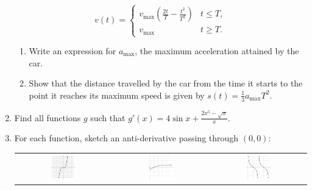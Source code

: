 \begin{enumerate}
\begin{displaymath}
          v(t) = \begin{cases} v_\text{max} \left( \frac{2t}{T} - \frac{t^2}{T^2} \right) & t \leq T, \\ v_\text{max} & t \geq T. \end{cases}
        \end{displaymath}
    \begin{enumerate}
      \item Write an expression for $ a_\text{max} $, the maximum acceleration attained by the car.
      \item Show that the distance travelled by the car from the time it starts to the point it reaches its maximum
            speed is given by $ s(t) = \frac{1}{3} a_\text{max} T^2 $.
    \end{enumerate}
  \item Find all functions $ g $ such that $ g'(x) = 4 \sin x + \frac{2x^5 - \sqrt{x}}{x} $.
  \item For each function, sketch an anti-derivative passing through $ (0, 0) $:
        \begin{center}
          \begin{tabular}{ccc}
            \includegraphics[width=0.28\textwidth]{anti1}&
            \includegraphics[width=0.28\textwidth]{anti2}&
            \includegraphics[width=0.28\textwidth]{anti3}\\

\end{tabular}
\end{center}
\end{enumerate}
